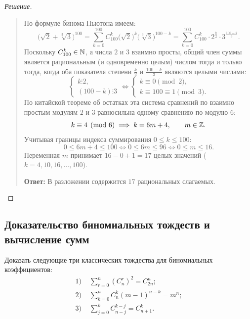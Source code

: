 \begin{proof}[Решение]~\\
    \begin{quote}
        По формуле бинома Ньютона имеем:
        \[
            \bigl(\sqrt{2} + \sqrt[3]{3}\bigr)^{100} = 
            \sum_{k=0}^{100} C_{100}^k \bigl(\sqrt{2}\bigr)^k 
            \bigl(\sqrt[3]{3}\bigr)^{100-k} = 
            \sum_{k=0}^{100} C_{100}^k \cdot 2^{\frac{k}{2}} \cdot 
            3^{\frac{100-k}{3}}.
        \]
        Поскольку $C_{100}^k \in \mathbb{N}$, а числа $2$ и $3$ взаимно просты, 
        общий член суммы является рациональным (и одновременно целым) 
        числом тогда и только тогда, когда оба показателя степени 
        $\frac{k}{2}$ и $\frac{100 - k}{3}$ являются целыми числами:
        \[
            \begin{cases}
                k \vdots 2, \\
                (100 - k) \vdots 3
            \end{cases}
            \iff
            \begin{cases}
                k \equiv 0 \pmod{2}, \\
                k \equiv 100 \equiv 1 \pmod{3}.
            \end{cases}
        \]
        По китайской теореме об остатках эта система сравнений по взаимно 
        простым модулям $2$ и $3$ равносильна одному сравнению по модулю $6$:
        \[
            k \equiv 4 \pmod{6} \implies k = 6m + 4, \qquad m \in \mathbb{Z}.
        \]
        Учитывая границы индекса суммирования $0 \le k \le 100$:
        \[
            0 \le 6m + 4 \le 100 \iff 0 \le 6m \le 96 \iff 0 \le m \le 16.
        \]
        Переменная $m$ принимает $16 - 0 + 1 = 17$ целых значений 
        ($k = 4, 10, 16, \dots, 100$).

        \textbf{Ответ:} В разложении содержится $17$ рациональных слагаемых.
    \end{quote}
\end{proof}

\subsection{Доказательство биномиальных тождеств и вычисление сумм}

\begin{problem}
    Доказать следующие три классических тождества для биномиальных 
    коэффициентов:
    \begin{align}
        \text{1) } & \sum_{r=0}^{n} (C_n^r)^2 = C_{2n}^n; 
        \label{eq:binom_sq_sum} \tag{6} \\
        \text{2) } & \sum_{k=0}^{n} C_n^k (m - 1)^{n-k} = m^n; 
        \label{eq:binom_m_pow} \tag{7} \\
        \text{3) } & \sum_{j=0}^{k} C_{n-j}^{k-j} = C_{n+1}^k. 
        \label{eq:binom_diag_sum} \tag{8}
    \end{align}
\end{problem}

